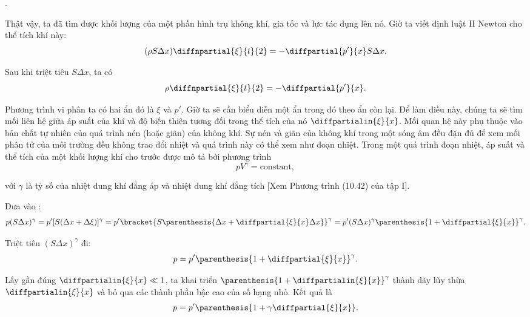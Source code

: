 .

Thật vậy, ta đã tìm được khối lượng của một phần hình trụ không khí, gia tốc và lực tác dụng lên nó. Giờ ta viết định luật II Newton cho thể tích khí này:
\begin{equation*}
	(\rho S \Delta{x}) \diffnpartial{\xi}{t}{2} = - \diffpartial{p'}{x} S \Delta{x}.
\end{equation*}

\noindent
Sau khi triệt tiêu $S\Delta{x}$, ta có
\begin{equation}\label{eq:14_65}
	\rho \diffnpartial{\xi}{t}{2} = - \diffpartial{p'}{x}.
\end{equation}

Phương trình vi phân ta có hai ẩn đó là $\xi$ và $p'$.
Giờ ta sẽ cần biểu diễn một ẩn trong đó theo ẩn còn lại.
Để làm điều này, chúng ta sẽ tìm mối liên hệ giữa áp suất của khí và độ biến thiên tương đối trong thể tích của nó $\diffpartialin{\xi}{x}$.
Mối quan hệ này phụ thuộc vào bản chất tự nhiên của quá trình nén (hoặc giãn) của không khí.
Sự nén và giãn của không khí trong một sóng âm đều đặn đủ để  xem mối phân tử của môi trường đều không trao đổi nhiệt và quá trình này có thể xem như đoạn nhiệt. Trong một quá trình đoạn nhiệt, áp suất và thể tích của một khối lượng khí cho trước được mô tả bởi phương trình
\begin{equation}\label{eq:14_66}
	p V^{\gamma} = \text{constant},
\end{equation}

\noindent
với $\gamma$ là tỷ số của nhiệt dung khí đẳng áp và nhiệt dung khí đẳng tích [Xem Phương trình (10.42) của tập I].

Đưa vào :
\begin{equation*}
	p (S \Delta{x})^{\gamma} = p'[S(\Delta{x}+\Delta{\xi})]^{\gamma} = p' \bracket{ S \parenthesis{\Delta{x} + \diffpartial{\xi}{x} \Delta{x}} }^{\gamma} = p' (S \Delta{x})^{\gamma} \parenthesis{1+ \diffpartial{\xi}{x}}^{\gamma}.
\end{equation*}

\noindent
Triệt tiêu $(S \Delta{x})^{\gamma}$ đi:
\begin{equation*}
	p = p' \parenthesis{1+ \diffpartial{\xi}{x}}^{\gamma}.
\end{equation*}

\noindent
Lấy gần đúng $\diffpartialin{\xi}{x}\ll 1$, ta khai triển $\parenthesis{1+ \diffpartialin{\xi}{x}}^{\gamma}$ thành dãy lũy thừa $\diffpartialin{\xi}{x}$ và bỏ qua các thành phần bậc cao của số hạng nhỏ.
Kết quả là
\begin{equation*}
	p = p' \parenthesis{ 1 + \gamma \diffpartial{\xi}{x} }.
\end{equation*}

